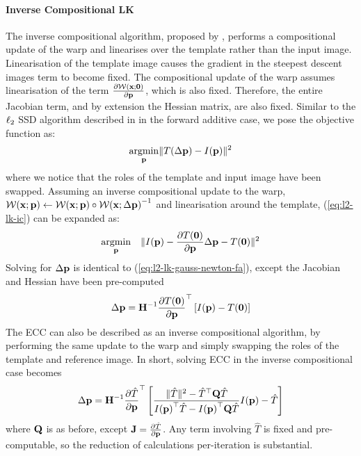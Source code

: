 \paragraph{Inverse Compositional LK}\label{subsubsec:lk-ic}
The inverse compositional algorithm, proposed by \citet{baker2004lucas}, 
performs a compositional update of the warp and
linearises over the template rather than the input image. Linearisation of the
template image causes the gradient in the steepest descent images term to become
fixed. The compositional update of the warp assumes linearisation of the term
$\frac{\partial \mathcal{W}(\boldsymbol{\mathbf{x}};\boldsymbol{\mathbf{0}})}{\partial \boldsymbol{\mathbf{p}}}$, which is also
fixed. Therefore, the entire Jacobian term, and by extension the Hessian matrix,
are also fixed. Similar to the $\ell_2$ SSD algorithm described in
in the forward additive case, we pose the objective function as:
\begin{equation}\label{eq:l2-lk-ic}
    \argmin_{\p} \norm{T(\Delta \p) - I(\p)}^2
\end{equation}
where we notice that the roles of the template and input image have been
swapped. Assuming an inverse compositional update to the warp,
$\mathcal{W}(\boldsymbol{\mathbf{x}};\boldsymbol{\mathbf{p}}) \leftarrow \mathcal{W}(\boldsymbol{\mathbf{x}};\boldsymbol{\mathbf{p}}) \circ {\mathcal{W}(\boldsymbol{\mathbf{x}};\Delta \boldsymbol{\mathbf{p}})}^{-1}$
and linearisation around the template, (\ref{eq:l2-lk-ic}) can be expanded as:
\begin{equation}\label{eq:l2-lk-linearised-ic}
    \argmin_{\p} \quad \norm{I(\p) - \frac{\partial T(\zero)}{\partial \p} \Delta \p - T(\zero)}^2
\end{equation}
Solving for $\Delta \boldsymbol{\mathbf{p}}$ is identical to (\ref{eq:l2-lk-gauss-newton-fa}), except
the Jacobian and Hessian have been pre-computed
\begin{equation}\label{eq:l2-lk-gauss-newton-ic}
    \Delta \boldsymbol{\mathbf{p}} = \boldsymbol{\mathbf{H}}^{-1} \frac{\partial T(\boldsymbol{\mathbf{0}})}{\partial \boldsymbol{\mathbf{p}}}^{\top} \left[ I(\boldsymbol{\mathbf{p}}) - T(\boldsymbol{\mathbf{0}}) \right]
\end{equation}
The ECC can also be described as an inverse compositional algorithm, by
performing the same update to the warp and simply swapping the roles of the
template and reference image. In short, solving ECC in the inverse compositional
case becomes
\begin{equation}\label{eq:ecc-lk-gauss-newton-ic}
    \Delta \boldsymbol{\mathbf{p}} = \boldsymbol{\mathbf{H}}^{-1} \frac{\partial \hat{T}}{\partial \boldsymbol{\mathbf{p}}}^{\top} \left[ \frac{\lVert{} \hat{T} \rVert^2 - \hat{T}^{\top} \boldsymbol{\mathbf{Q}} \hat{T}}{{I(\boldsymbol{\mathbf{p}})}^{\top} \hat{T} - {I(\boldsymbol{\mathbf{p}})}^{\top} \boldsymbol{\mathbf{Q}} \hat{T}} I(\boldsymbol{\mathbf{p}}) - \hat{T} \right]
\end{equation}
where $\boldsymbol{\mathbf{Q}}$ is as before, except $\boldsymbol{\mathbf{J}} = \frac{\partial \hat{T}}{\partial \boldsymbol{\mathbf{p}}}$. 
Any term involving $\hat{T}$ is fixed and pre-computable, so the reduction of 
calculations per-iteration is substantial.

